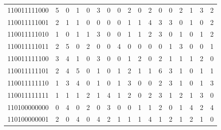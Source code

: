 \documentclass[10pt,a4paper]{article}
\begin{document}
\begin{longtable}{ |c|c|c|c|c|c|c|c|c|c|c|c|c|c|c|c|c| }
    110011111000              & 5                            & 0                                & 1                            & 0                              & 3   & 0   & 0   & 2   & 0   & 2   & 0   & 0   & 2   & 1   & 3   & 2   \\
    110011111001              & 2                            & 1                                & 1                            & 0                              & 0   & 0   & 0   & 1   & 1   & 4   & 3   & 3   & 0   & 1   & 0   & 2   \\
    110011111010              & 1                            & 0                                & 1                            & 1                              & 3   & 0   & 0   & 1   & 1   & 2   & 3   & 0   & 1   & 0   & 1   & 2   \\
    110011111011              & 2                            & 5                                & 0                            & 2                              & 0   & 0   & 4   & 0   & 0   & 0   & 0   & 1   & 3   & 0   & 0   & 1   \\
    110011111100              & 3                            & 4                                & 1                            & 0                              & 3   & 0   & 0   & 1   & 2   & 0   & 2   & 1   & 1   & 1   & 2   & 0   \\
    110011111101              & 2                            & 4                                & 5                            & 0                              & 1   & 0   & 1   & 2   & 1   & 1   & 6   & 3   & 1   & 0   & 1   & 1   \\
    110011111110              & 1                            & 3                                & 4                            & 0                              & 1   & 0   & 1   & 3   & 0   & 0   & 2   & 3   & 1   & 0   & 1   & 3   \\
    110011111111              & 1                            & 1                                & 1                            & 2                              & 1   & 4   & 1   & 2   & 0   & 2   & 3   & 1   & 2   & 1   & 3   & 0   \\
    110100000000              & 0                            & 4                                & 0                            & 2                              & 0   & 3   & 0   & 0   & 1   & 1   & 2   & 0   & 1   & 4   & 2   & 4   \\
    110100000001              & 2                            & 0                                & 4                            & 0                              & 4   & 2   & 1   & 1   & 1   & 4   & 1   & 2   & 1   & 2   & 1   & 0   \\

\end{longtable}
\end{document}
